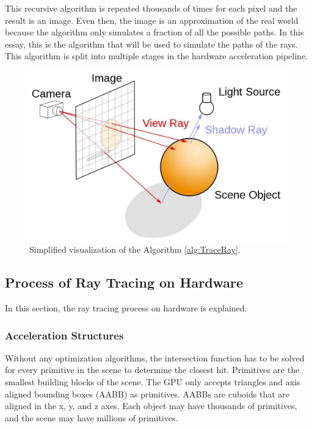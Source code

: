 \documentclass[12pt]{article}
\begin{document}
This recursive algorithm is repeated thousands of times for each pixel and the result is an image.
Even then, the image is an approximation of the real world because the algorithm only simulates a fraction of all the possible paths.
In this essay, this is the algorithm that will be used to simulate the paths of the rays.
This algorithm is split into multiple stages in the hardware acceleration pipeline.

\begin{figure}[H]
    \begin{center}
        \includegraphics[scale=0.22]{RayTracingImage}
    \end{center}
    \caption{Simplified visualization of the Algorithm \ref{alg:TraceRay}. \parencite{NVIDIA:Raytracing}}
    \label{fig:RayTracingImage}
\end{figure}

\subsection{Process of Ray Tracing on Hardware}
In this section, the ray tracing process on hardware is explained.

\subsubsection{Acceleration Structures}

Without any optimization algorithms, the intersection function has to be solved for every primitive in the scene to determine the closest hit.
Primitives are the smallest building blocks of the scene. The GPU only accepts triangles and axis aligned bounding boxes (AABB) as primitives.
AABBs are cuboids that are aligned in the x, y, and z axes.
Each object may have thousands of primitives, and the scene may have millions of primitives.
\end{document}
